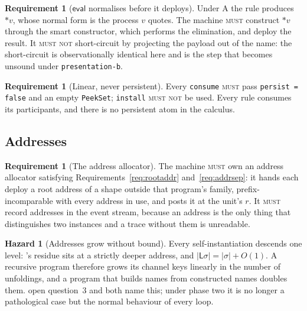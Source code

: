 \documentclass[11pt,a4paper]{article}
\newcommand{\code}[1]{\texttt{#1}}
\newcommand{\MUST}{\textsc{must}}
\newcommand{\MUSTNOT}{\textsc{must not}}
\newcommand{\drp}[1]{{*}#1}
\newcommand{\Lft}{\mathsf{L}}
\theoremstyle{definition}
\newtheorem{requirement}[definition]{Requirement}
\newtheorem{hazard}[definition]{Hazard}
\theoremstyle{plain}
\begin{document}
\begin{requirement}[$\mathsf{eval}$ normalises before it deploys]
\label{req:evalnorm}
Under A the rule produces $\drp{v}$, whose normal form is the process $v$
quotes. The machine \MUST{} construct $\drp{v}$ through the smart constructor,
which performs the elimination, and deploy the result. It \MUSTNOT{}
short-circuit by projecting the payload out of the name: the short-circuit is
observationally identical here and is the step that becomes unsound under
\code{presentation-b}.
\end{requirement}

\begin{requirement}[Linear, never persistent]\label{req:linear}
Every \code{consume} \MUST{} pass \code{persist = false} and an empty
\code{PeekSet}; \code{install} \MUSTNOT{} be used. Every rule consumes its
participants, and there is no persistent atom in the calculus.
\end{requirement}

\subsection{Addresses}

\begin{requirement}[The address allocator]\label{req:allocator}
The machine \MUST{} own an address allocator satisfying
Requirements~\ref{req:rootaddr} and~\ref{req:addrsep}: it hands each deploy a
root address of a shape outside that program's family, prefix-incomparable
with every address in use, and posts it at the unit's $r$. It \MUST{} record
addresses in the event stream, because an address is the only thing that
distinguishes two instances and a trace without them is unreadable.
\end{requirement}

\begin{hazard}[Addresses grow without bound]\label{haz:growth}
Every self-instantiation descends one level: \cite[Ex.~6.9]{draft3}'s residue
sits at a strictly deeper address, and $|\Lft\sigma| = |\sigma| + O(1)$. A
recursive program therefore grows its channel keys linearly in the number of
unfoldings, and a program that builds names from constructed names doubles
them. \cite[\S12]{draft3} open question~3 and \cite[\S7]{logic} both name
this; under phase two it is no longer a pathological case but the normal
behaviour of every loop.
\end{hazard}
\end{document}
